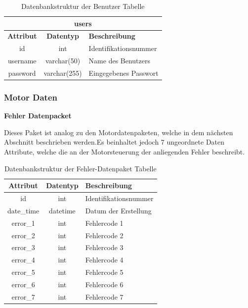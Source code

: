 \begin{table}[H]
	\begin{center}
		\begin{tabular}{|c|c|l|}
		\hline
		\multicolumn{3}{|c|}{\textbf{users}}                          \\ \hline
		\textbf{Attribut} & \textbf{Datentyp} & \textbf{Beschreibung} \\ \hline
		id                & int               & Identifikationsnummer \\ \hline
		username          & varchar(50)       & Name des Benutzers    \\ \hline
		password          & varchar(255)      & Eingegebenes Passwort \\ \hline
		\end{tabular}
		\caption{Datenbankstruktur der Benutzer Tabelle}
		\label{tab:logindata}
	\end{center}
\end{table}

\subsubsection{Motor Daten}

\textbf{Fehler Datenpacket}

Dieses Paket ist analog zu den Motordatenpaketen, welche in dem nächsten Abschnitt beschrieben werden.Es beinhaltet jedoch 7 ungeordnete Daten Attribute, welche die an der Motorsteuerung der anliegenden Fehler beschreibt.

\begin{table}[H]
	\begin{center}
		\begin{tabular}{|c|c|l|}
			\hline
			\textbf{Attribut}           & \textbf{Datentyp} & \textbf{Beschreibung}                     \\ \hline
			id                          & int               & Identifikationsnummer                     \\ \hline
			date\_time                	& datetime          & Datum der Erstellung        				\\ \hline
			error\_1                 	& int	            & Fehlercode 1                      		\\ \hline
			error\_2            		& int               & Fehlercode 2            					\\ \hline
			error\_3        			& int               & Fehlercode 3       						\\ \hline
			error\_4           			& int               & Fehlercode 4       	 					\\ \hline
			error\_5    				& int               & Fehlercode 5 								\\ \hline
			error\_6					& int               & Fehlercode 6        						\\ \hline
			error\_7					& int               & Fehlercode 7    							\\ \hline
		\end{tabular}
		\caption{Datenbankstruktur der Fehler-Datenpaket Tabelle}
		\label{tab:data4}
	\end{center}
\end{table}

